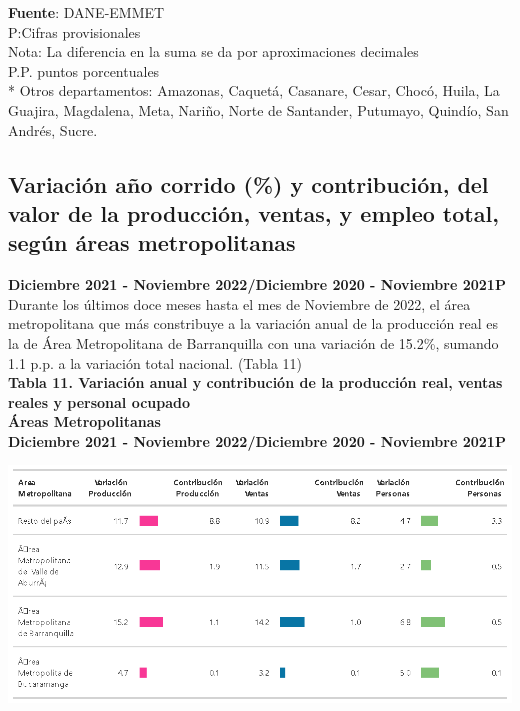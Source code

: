 \documentclass[
]{article}
\begin{document}
\textbf{Fuente}: DANE-EMMET\\
P:Cifras provisionales\\
Nota: La diferencia en la suma se da por aproximaciones decimales\\
P.P. puntos porcentuales\\
* Otros departamentos: Amazonas, Caquetá, Casanare, Cesar, Chocó, Huila,
La Guajira, Magdalena, Meta, Nariño, Norte de Santander, Putumayo,
Quindío, San Andrés, Sucre.\\

\hypertarget{variaciuxf3n-auxf1o-corrido-y-contribuciuxf3n-del-valor-de-la-producciuxf3n-ventas-y-empleo-total-seguxfan-uxe1reas-metropolitanas-1}{%
\subsection{Variación año corrido (\%) y contribución, del valor de la
producción, ventas, y empleo total, según áreas
metropolitanas}\label{variaciuxf3n-auxf1o-corrido-y-contribuciuxf3n-del-valor-de-la-producciuxf3n-ventas-y-empleo-total-seguxfan-uxe1reas-metropolitanas-1}}

\textbf{Diciembre 2021 - Noviembre 2022/Diciembre 2020 - Noviembre
2021P}\\

Durante los últimos doce meses hasta el mes de Noviembre de 2022, el
área metropolitana que más constribuye a la variación anual de la
producción real es la de Área Metropolitana de Barranquilla con una
variación de 15.2\%, sumando 1.1 p.p. a la variación total nacional.
(Tabla 11)\\

\textbf{Tabla 11. Variación anual y contribución de la producción real,
ventas reales y personal ocupado}\\
\textbf{Áreas Metropolitanas}\\
\textbf{Diciembre 2021 - Noviembre 2022/Diciembre 2020 - Noviembre
2021P}\\

\begin{center}\includegraphics[width=13.14in]{tabla11_1} \end{center}
\end{document}
